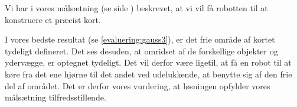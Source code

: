 Vi har i vores målsætning (se side \pageref{problem:maalsaetning}) beskrevet, at vi vil få robotten til at konstruere et præcist kort.



I vores bedste resultat (se \cref{evaluering:gauss3}), er det frie område af kortet tydeligt defineret.
Det ses desuden, at omridset af de forskellige objekter og ydervægge, er optegnet tydeligt.
Det vil derfor være ligetil, at få en robot til at køre fra det ene hjørne til det andet ved udelukkende, at benytte sig af den frie del af området.
Det er derfor vores vurdering, at løsningen opfylder vores målsætning tilfredsstillende.